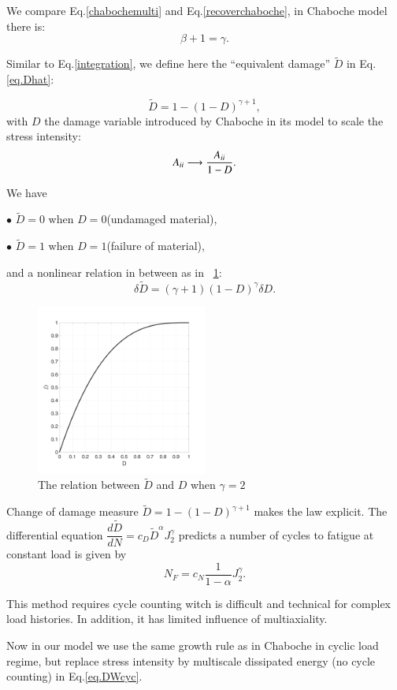 \documentclass[3p,times,number,review]{elsarticle}
\newcommand{\figref}[1]{\figurename~\ref{#1}}
\begin{document}
We compare Eq.\eqref{chabochemulti} and Eq.\eqref{recoverchaboche}, in Chaboche model there is:
$$\beta+1=\gamma. $$

Similar to Eq.\eqref{integration}, we define here the ``equivalent damage'' $\tilde{D}$ in Eq.\eqref{eq.Dhat}:

\begin{equation}
\tilde{D}=1-(1-D)^{\gamma+1},
\label{eq.Dhat}
\end{equation}
with $D$ the damage variable introduced by Chaboche in its model to scale the stress intensity:
$${A}_{\uppercase\expandafter{\romannumeral2}} \longrightarrow \dfrac{{A}_{\uppercase\expandafter{\romannumeral2}}}{1-D}.$$

We have 

$\bullet$ $\tilde{D}=0$ when $D=0$(undamaged material),

$\bullet$ $\tilde{D}=1$ when $D=1$(failure of material),	

and a nonlinear relation in between as in \figref{fig.Dhat}:
$$\delta\tilde{D}=\left(\gamma+1 \right)\left( 1-D\right)^\gamma \delta D.$$	
\begin{figure}
	\centering
	\includegraphics[width=0.5\textwidth]{figures//Dhat.png} 
	\caption{The relation between $\tilde{D}$ and $D$ when $\gamma=2$}
	\label{fig.Dhat}
\end{figure}

Change of damage measure $\tilde{D} = 1 - (1-D)^{\gamma+1}$ makes the law explicit. The differential equation
$
\dfrac{d\tilde{D}}{dN} = c_D {\tilde{D}}^\alpha J_2^\gamma
$
predicts a number of cycles to fatigue at constant load is given by
$$
N_F =c_N \frac{1}{1-\alpha} J_2^\gamma.
$$

This method requires cycle counting witch is difficult and technical for complex load histories. In addition, it has limited influence of multiaxiality.


Now in our model we use the same growth rule as in Chaboche in cyclic load regime, but replace stress intensity by multiscale dissipated energy (no cycle counting) in Eq.\eqref{eq.DWcyc}.
\end{document}
